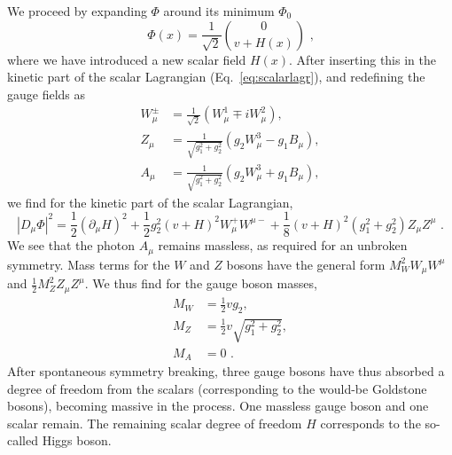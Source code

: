 We proceed by expanding $\Phi$ around its minimum $\Phi_0$
\begin{equation}
  \Phi(x) = \frac{1}{\sqrt{2}} \binom{0}{ v + H(x) } \textrm{ ,}
  \label{eq:higgsexpansion}
\end{equation}
where we have introduced a new scalar field $H(x)$.
After inserting this in the kinetic part of the scalar Lagrangian (Eq.~\ref{eq:scalarlagr}), and
redefining the gauge fields as
\begin{align}
  W^\pm_\mu &= \frac{1}{\sqrt{2}} (W_\mu^1 \mp i W_\mu^2), \\
  Z_\mu &= \frac{1}{\sqrt{g_1^2 + g_2^2}} (g_2W_\mu^3 - g_1 B_\mu),\\
  A_\mu &= \frac{1}{\sqrt{g_1^2 + g_2^2}} (g_2W_\mu^3 + g_1 B_\mu) ,
\end{align}
we find for the kinetic part of the scalar Lagrangian,
\begin{equation}
  |D_\mu \Phi|^2 = \frac{1}{2} (\partial_\mu H)^2 + \frac{1}{2}g_2^2(v+H)^2 W^+_\mu W^{\mu -} +
\frac{1}{8}(v+H)^2 (g_1^2 + g_2^2) Z_\mu Z^\mu \textrm{ .}
\end{equation}
We see that the photon $A_\mu$ remains massless, as required for an unbroken symmetry. Mass terms
for the $W$ and $Z$ bosons have the general form $M_W^2 W_\mu W^\mu$ and $ \frac{1}{2} M_Z^2 Z_\mu
Z^\mu$. We thus find for the gauge boson masses,
\begin{align}
  M_W &= \frac{1}{2} v g_2 ,\\
  M_Z &= \frac{1}{2} v \sqrt{g_1^2 + g_2^2}, \\
  M_A &= 0 \textrm{ .}
\end{align}
After spontaneous symmetry breaking, three gauge bosons have thus absorbed a degree of freedom from
the scalars (corresponding to the would-be Goldstone bosons), becoming massive in the process. One
massless gauge boson and one scalar remain.
The remaining scalar degree of freedom $H$ corresponds to the so-called Higgs boson. 

